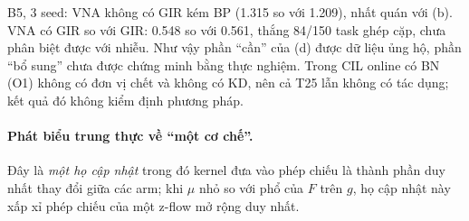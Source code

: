 \begin{remark}
B5, 3 seed: VNA không có GIR kém BP (1.315 so với 1.209), nhất quán với (b). VNA có GIR so với GIR: 0.548 so với 0.561, thắng 84/150 task ghép cặp, chưa phân biệt được với nhiễu. Như vậy phần ``cần'' của (d) được dữ liệu ủng hộ, phần ``bổ sung'' chưa được chứng minh bằng thực nghiệm. Trong CIL online có BN (O1) không có đơn vị chết và không có KD, nên cả T25 lẫn  không có tác dụng; kết quả đó không kiểm định phương pháp.
\end{remark}

\paragraph{Phát biểu trung thực về ``một cơ chế''.} Đây là \emph{một họ cập nhật} trong đó kernel đưa vào phép chiếu là thành phần duy nhất thay đổi giữa các arm; khi $\mu$ nhỏ so với phổ của $F$ trên $g$, họ cập nhật này xấp xỉ phép chiếu của một z-flow mở rộng duy nhất.
